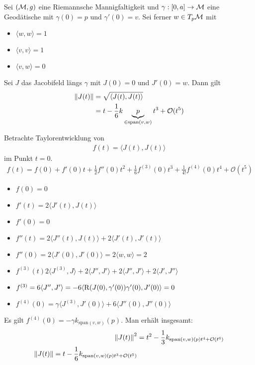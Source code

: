 \begin{lem}
    Sei $(\mathcal{M} , g)$ eine Riemannsche Mannigfaltigkeit und 
    $\gamma : [0,a] \to\mathcal{M}$ eine Geodätische mit
    $\gamma (0) = p$ und $\gamma ' (0) = v$.
    Sei ferner $w \in T_p\mathcal{M}$ mit
    \begin{itemize}
        \item $\langle w , w \rangle = 1$
        \item $\langle v, v \rangle = 1$
        \item $\langle v, w \rangle = 0$
    \end{itemize}
    Sei $J$ das Jacobifeld längs $\gamma$ mit $J(0)=0$ und $J'(0)=w$.
    Dann gilt 
    \begin{align*}
        \norm{J(t)} &= \sqrt{\langle J(t) , J(t) \rangle} \\
        &= t - \frac{1}{6} k \underbrace{p}_{\in \text{span}(v, w)} t^3 + \mathcal{O}(t^5)
    \end{align*}
\end{lem}
\begin{bew}
Betrachte Taylorentwicklung von 
\begin{align*}
    f(t) = \langle J(t),J(t) \rangle 
\end{align*}
im Punkt $t=0$.
\begin{align*}
    f(t) = f(0) + f'(0)t + \frac{1}{2} f''(0)t^2 + \frac{1}{6} f^{(3)} (0) t^3 + \frac{1}{4!} f^{(4)}(0) t^4 + \mathcal{O}(t^5)
\end{align*}
\begin{itemize}
    \item $f(0)=0$
    \item $f'(t)= 2 \langle J'(t),J(t) \rangle$
    \item $f'(0)=0$
    \item $f''(t) = 2 \langle J''(t), J(t) \rangle + 2\langle J'(t) , J'(t)\rangle$
    \item $f''(0) = 2 \langle J'(0) , J'(0) \rangle = 2 \langle w,w \rangle = 2$
    \item $f^{(3)}(t) 2 \langle J^{(3)} , J \rangle + 2 \langle J'' , J' \rangle
        + 2 \langle J'' , J' \rangle + 2 \langle J' , J'' \rangle$
    \item $f^{(3)} = 6 \langle J'' , J' \rangle 
        = - 6 \langle \operatorname{R} (J(0) , \gamma '(0))\gamma '(0) , J'(0)\rangle 
        = 0$
    \item $f^{(4)} (0) = \gamma \langle J^{(3)},J'(0)\rangle + 6 \langle J''(0), J''(0) \rangle$
\end{itemize}
Es gilt $f^{(4)}(0) = - \gamma k_{\text{span}(v,w)}(p)$.
Man erhält insgesamt:
\begin{align}
    \norm{J(t)}^2 &= t^2 - \frac{1}{3} k_{\text{span}(v,w) (p)t^4 + \mathcal{O}(t^6)}\\
    \norm{J(t)}=t - \frac{1}{6} k_{\text{span}(v,w) (p)t^3 + \mathcal{O}(t^5)}\\
\end{align}
\end{bew}
